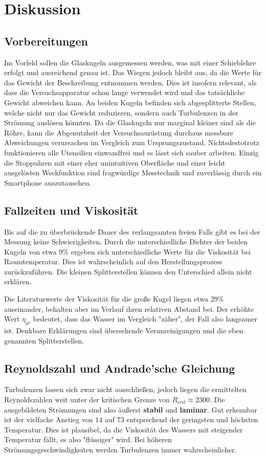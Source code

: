 \section{Diskussion}
\label{sec:Diskussion}
\subsection{Vorbereitungen}
Im Vorfeld sollen die Glaskugeln ausgemessen werden, was mit einer Schieblehre erfolgt und ausreichend genau ist. Das Wiegen jedoch bleibt aus, da 
die Werte für das Gewicht der Beschreibung entnommen werden. Dies ist insofern relevant, als dass die Versuchsapparatur schon lange verwendet wird
und das tatsächliche Gewicht abweichen kann. An beiden Kugeln befinden sich abgesplitterte Stellen, welche nicht nur das Gewicht reduzieren, sondern
auch Turbulenzen in der Strömung auslösen könnten.
Da die Glaskugeln nur marginal kleiner sind als die Röhre, kann die Abgenutzheit der Versuchsaurüstung durchaus messbare Abweichungen verursachen im Vergleich
zum Ursprungszustand.
Nichtsdestotrotz funktionieren alle Utensilien einwandfrei und es lässt sich sauber arbeiten. Einzig die Stoppuhren mit einer eher unintuitiven Oberfläche und einer
leicht ausgelösten Weckfunktion sind fragwürdige Messtechnik und zuverlässig durch ein Smartphone auszutauschen.

\subsection{Fallzeiten und Viskosität}
Bis auf die zu überbrückende Dauer des verlangsamten freien Falls gibt es bei der Messung keine Schwierigkeiten. Durch die unterschiedliche Dichter der beiden
Kugeln von etwa $9\%$ ergeben sich unterschiedliche Werte für die Viskosität bei Raumtemperatur. Dies ist wahrscheinlich auf den Herstellungsprozess zurückzuführen.
Die kleinen Splitterstellen können den Unterschied allein nicht erklären.

Die Literaturwerte der Viskosität für die große Kugel liegen etwa $29\%$ auseinander, behalten aber im Verlauf ihren relativen Abstand bei. Der erhöhte Wert $\eta_{gr}$ bedeutet, dass das Wasser im Vergleich
"zäher", der Fall also langsamer ist. Denkbare Erklärungen sind übersehende Verunreinigungen und die eben genannten Splitterstellen.

\subsection{Reynoldszahl und Andrade'sche Gleichung}
Turbulenzen lassen sich zwar nicht ausschließen, jedoch liegen die ermittelten Reynoldszahlen weit unter der kritischen Grenze von $R_{crit} \approx 2300$.
Die ausgebildeten Strömungen sind also äußerst \textbf{stabil} und \textbf{laminar}. Gut erkennbar ist der vielfache Anstieg von $14$ auf $73$ entsprechend der geringsten und höchsten Temperatur.
Dies ist plausibel, da die Viskosität des Wassers mit steigender Temperatur fällt, es also "flüssiger" wird. Bei höheren Strömungsgeschwindigkeiten werden Turbulenzen immer wahrscheinlicher.

